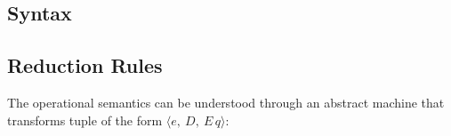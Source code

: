   \subsection{Syntax}
  \begin{figure}[!h]
  \end{figure}

  \subsection{Reduction Rules}
  The operational semantics can be understood through an abstract machine that transforms tuple of the form $\langle e,\ D,\ E\, q \rangle$:

